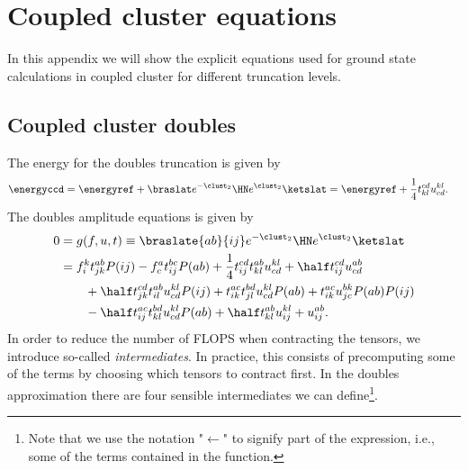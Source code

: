 \chapter{Coupled cluster equations}
    In this appendix we will show the explicit equations used for ground state
    calculations in coupled cluster for different truncation levels.

    \section{Coupled cluster doubles}
        The energy for the doubles truncation is given by
        \begin{align}
            \energyccd
            &= \energyref
            + \braslat e^{-\clust_2}\HN e^{\clust_2}\ketslat
            = \energyref
            + \frac{1}{4}t^{cd}_{kl} u^{kl}_{cd}.
        \end{align}
        The doubles amplitude equations is given by
        \begin{align}
            0 &= g(f, u, t)
            \equiv \braslate{ab}{ij}e^{-\clust_2}\HN e^{\clust_2}\ketslat
            \\
            &=
            f^{k}_{i} t^{ab}_{jk} P(ij)
            - f^{a}_{c} t^{bc}_{ij} P(ab)
            + \frac{1}{4} t^{cd}_{ij} t^{ab}_{kl} u^{kl}_{cd}
            + \half t^{cd}_{ij} u^{ab}_{cd}
            \nonumber \\
            &\qquad
            + \half t^{cd}_{jk} t^{ab}_{il} u^{kl}_{cd} P(ij)
            + t^{ac}_{ik} t^{bd}_{jl} u^{kl}_{cd} P(ab)
            + t^{ac}_{ik} u^{bk}_{jc} P(ab) P(ij)
            \nonumber \\
            &\qquad
            - \half t^{ac}_{ij} t^{bd}_{kl} u^{kl}_{cd} P(ab)
            + \half t^{ab}_{kl} u^{kl}_{ij}
            + u^{ab}_{ij}.
        \end{align}
        In order to reduce the number of FLOPS when contracting the tensors, we
        introduce so-called \emph{intermediates}. In practice, this consists of
        precomputing some of the terms by choosing which tensors to contract
        first. In the doubles approximation there are four sensible
        intermediates we can define\footnote{Note that we use the notation
        "$\gets$" to signify part of the expression, i.e., some of the terms
        contained in the function.}.
